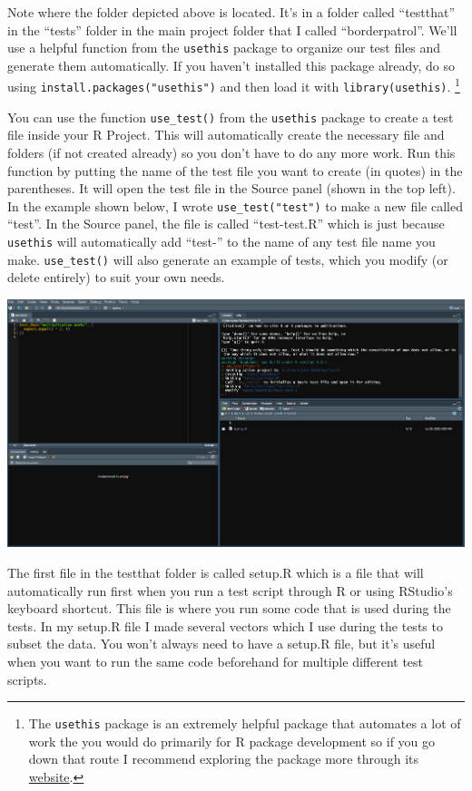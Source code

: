 \documentclass[
  12pt,
]{book}
\begin{document}
Note where the folder depicted above is located. It's in a folder called ``testthat'' in the ``tests'' folder in the main project folder that I called ``borderpatrol''. We'll use a helpful function from the \texttt{usethis} package to organize our test files and generate them automatically. If you haven't installed this package already, do so using \texttt{install.packages("usethis")} and then load it with \texttt{library(usethis)}. \footnote{The \texttt{usethis} package is an extremely helpful package that automates a lot of work the you would do primarily for R package development so if you go down that route I recommend exploring the package more through its \href{https://usethis.r-lib.org/index.html}{website}.}

You can use the function \texttt{use\_test()} from the \texttt{usethis} package to create a test file inside your R Project. This will automatically create the necessary file and folders (if not created already) so you don't have to do any more work. Run this function by putting the name of the test file you want to create (in quotes) in the parentheses. It will open the test file in the Source panel (shown in the top left). In the example shown below, I wrote \texttt{use\_test("test")} to make a new file called ``test''. In the Source panel, the file is called ``test-test.R'' which is just because \texttt{usethis} will automatically add ``test-'' to the name of any test file name you make. \texttt{use\_test()} will also generate an example of tests, which you modify (or delete entirely) to suit your own needs.

\includegraphics{images/usethis_test.PNG}

The first file in the testthat folder is called setup.R which is a file that will automatically run first when you run a test script through R or using RStudio's keyboard shortcut. This file is where you run some code that is used during the tests. In my setup.R file I made several vectors which I use during the tests to subset the data. You won't always need to have a setup.R file, but it's useful when you want to run the same code beforehand for multiple different test scripts.
\end{document}
